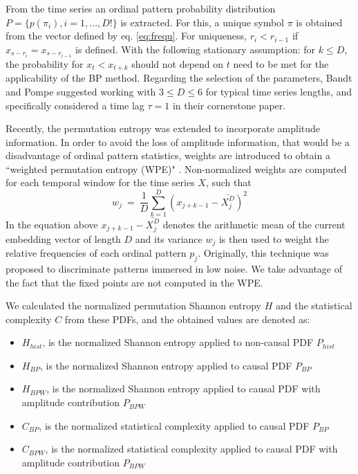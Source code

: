From the time series an ordinal pattern probability distribution $P = \{ p(\pi_i), i = 1, \dots, D! \}$ is extracted.
For this, a unique symbol $\pi$ is obtained from the vector defined by eq. \ref{eq:frequ}.
For uniqueness, $r_i < r_{i-1}$ if $x_{s-r_{i}} = x_{s-r_{i-1}}$ is defined.
With the following stationary assumption: for $k \leq D$, the probability for $x_t < x_{t+k}$ should not depend on $t$ need to be met for the applicability of the BP method.
Regarding the selection of the parameters, Bandt and Pompe suggested working with $3 \leq D \leq 6$ for typical time series lengths, and specifically considered a time lag $\tau = 1$ in their cornerstone paper.

Recently, the permutation entropy was extended to incorporate amplitude information.
In order to avoid the loss of amplitude information, that would be a disadvantage of ordinal pattern statistics, weights are introduced to obtain a ``weighted permutation entropy (WPE)" \cite{Fadlallah2013}.
Non-normalized weights are computed for each temporal window for the time series $X$, such that
\begin{equation}
\label{WPE_weigth}
w_j~=~\frac{1}{D}\sum_{k=1}^{D} \left(x_{j+k-1}-\bar{X_j^D}\right)^2
\end{equation}
In the equation above $x_{j+k-1}-\bar{X_j^D}$ denotes the arithmetic mean of the current embedding vector of length $D$ and its variance $w_j$ is then used to weight the relative frequencies of each ordinal pattern $p_j$.
Originally, this technique was proposed to discriminate patterns immersed in low noise.
We take advantage of the fact that the fixed points are not computed in the WPE.

We calculated the normalized permutation Shannon entropy $H$ and the statistical complexity $C$ from these PDFs, and the obtained values are denoted as:
\begin{itemize}[leftmargin=*,labelsep=5.8mm]
	\item $H_{hist}$, is the normalized Shannon entropy applied to non-causal PDF $P_{hist}$
	\item $H_{BP}$, is the normalized Shannon entropy applied to causal PDF $P_{BP}$
	\item $H_{BPW}$, is the normalized Shannon entropy applied to causal PDF with amplitude contribution $P_{BPW}$
	\item $C_{BP}$, is the normalized statistical complexity applied to causal PDF $P_{BP}$
	\item $C_{BPW}$, is the normalized statistical complexity applied to causal PDF with amplitude contribution $P_{BPW} $
\end{itemize}

